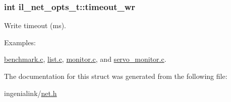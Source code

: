 \subsubsection[{\texorpdfstring{timeout\+\_\+wr}{timeout_wr}}]{\setlength{\rightskip}{0pt plus 5cm}int il\+\_\+net\+\_\+opts\+\_\+t\+::timeout\+\_\+wr}\hypertarget{structil__net__opts__t_a63e3d6b10ac90e08d629ac4458505d1a}{}\label{structil__net__opts__t_a63e3d6b10ac90e08d629ac4458505d1a}


Write timeout (ms). 

\begin{Desc}
\item[Examples\+: ]\par
\hyperlink{benchmark_8c-example}{benchmark.\+c}, \hyperlink{list_8c-example}{list.\+c}, \hyperlink{monitor_8c-example}{monitor.\+c}, and \hyperlink{servo_monitor_8c-example}{servo\+\_\+monitor.\+c}.\end{Desc}


The documentation for this struct was generated from the following file\+:\begin{DoxyCompactItemize}
\item 
ingenialink/\hyperlink{net_8h}{net.\+h}\end{DoxyCompactItemize}
